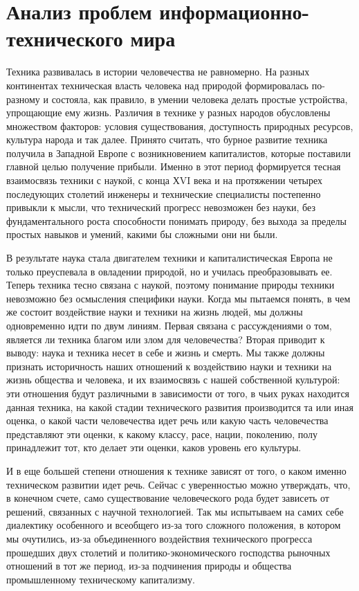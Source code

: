 \section{Анализ проблем информационно-технического мира}

Техника развивалась в истории человечества не равномерно. На разных континентах техническая власть человека над природой формировалась по-разному и состояла, как правило, в умении человека делать простые устройства, упрощающие ему жизнь. Различия в технике у разных народов обусловлены множеством факторов: условия существования, доступность природных ресурсов, культура народа и так далее.  Принято считать, что бурное развитие техника получила в Западной Европе с возникновением капиталистов, которые поставили главной целью получение прибыли. Именно в этот период формируется тесная взаимосвязь техники с наукой, с конца ХVI века и на протяжении четырех последующих столетий инженеры и технические специалисты постепенно привыкли к мысли, что технический прогресс невозможен без науки, без фундаментального роста способности понимать природу, без выхода за пределы простых навыков и умений, какими бы сложными они ни были.

В результате наука стала двигателем техники и капиталистическая Европа не только преуспевала в овладении природой, но и училась преобразовывать ее. Теперь техника тесно связана с наукой, поэтому понимание природы техники невозможно без осмысления специфики науки. Когда мы пытаемся понять, в чем же состоит воздействие науки и техники на жизнь людей, мы должны одновременно идти по двум линиям. Первая связана с рассуждениями о том, является ли техника благом или злом для человечества? Вторая приводит к выводу: наука и техника несет в себе и жизнь и смерть. Мы также должны признать историчность наших отношений к воздействию науки и техники на жизнь общества и человека, и их взаимосвязь с нашей собственной культурой: эти отношения будут различными в зависимости от того, в чьих руках находится данная техника, на какой стадии технического развития производится та или иная оценка, о какой части человечества идет речь или какую часть человечества представляют эти оценки, к какому классу, расе, нации, поколению, полу принадлежит тот, кто делает эти оценки, каков уровень его культуры.

И в еще большей степени отношения к технике зависят от того, о каком именно техническом развитии идет речь.  Сейчас с уверенностью можно утверждать, что, в конечном счете, само существование человеческого рода будет зависеть от решений, связанных с научной технологией. Так мы испытываем на самих себе диалектику особенного и всеобщего из-за того сложного положения, в котором мы очутились, из-за объединенного воздействия технического прогресса прошедших двух столетий и политико-экономического господства рыночных отношений в тот же период, из-за подчинения природы и общества промышленному техническому капитализму.

